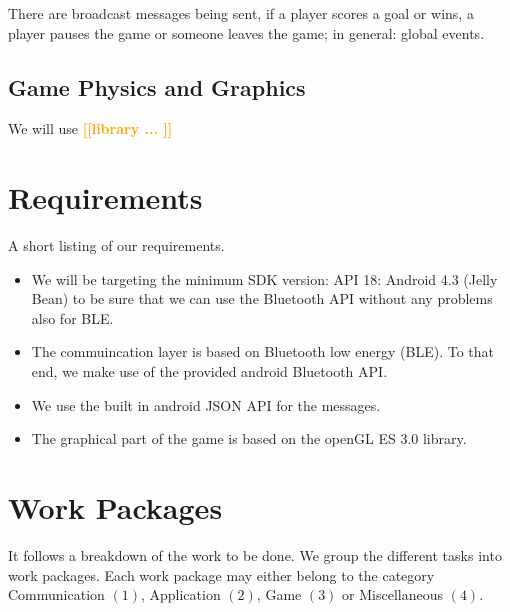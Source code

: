 \documentclass{report}
\newcommand{\todo}[1]{\textsf{\textbf{\textcolor{orange}{[[#1]]}}}}
\begin{document}
There are broadcast messages being sent, if a player scores a goal or wins, a player pauses the game or someone leaves the game; in general: global events.

\subsection{Game Physics and Graphics} We will use \todo{library ... } 

\section{Requirements}
A short listing of our requirements.

\begin{itemize}
        \item We will be targeting the minimum SDK version: API 18: Android 4.3 (Jelly Bean) to be sure that we can use the Bluetooth API without any problems also for BLE.
        \item The commuincation layer is based on Bluetooth low energy (BLE). To that end, we make use of the provided android Bluetooth API.
        \item We use the built in android JSON API for the messages.
        \item The graphical part of the game is based on the openGL ES 3.0 library.
\end{itemize}

\section{Work Packages}
It follows a breakdown of the work to be done. We group the different tasks into work packages. Each work package may either belong to the category Communication $(1)$, Application $(2)$, Game $(3)$ or Miscellaneous $(4)$.
\end{document}
